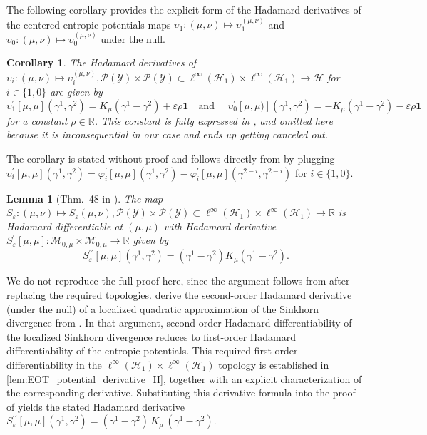\documentclass{article}
\theoremstyle{plain}
\newtheorem{lemma}[theorem]{Lemma}
\newtheorem{corollary}[theorem]{Corollary}
\theoremstyle{definition}
\theoremstyle{remark}
\newcommand{\R}{\mathbb{R}}
\newcommand{\cH}{\mathcal{H}}
\newcommand{\cP}{\mathcal{P}}
\newcommand{\cM}{\mathcal{M}}
\newcommand{\cY}{\mathcal{Y}}
\newcommand{\1}{\mathbbm{1}}
\newcommand{\eps}{\varepsilon}
\theoremstyle{plain}
\theoremstyle{definition}
\newcommand{\tand}{\textrm{and }}
\begin{document}
     The following corollary provides the explicit form of the Hadamard derivatives of the centered entropic potentials maps $\upsilon_1: (\mu, \nu) \mapsto \upsilon_1^{(\mu, \nu)}$ and $\upsilon_0: (\mu, \nu) \mapsto \upsilon_0^{(\mu, \nu)}$ under the null. 
    \begin{corollary}\label{cor:upsilon_hadamard_diff}
        The Hadamard derivatives of $\upsilon_i : (\mu, \nu) \mapsto \upsilon_i^{(\mu, \nu)}, \cP(\cY) \times \cP(\cY) \subset \ell^\infty(\cH_1) \times \ell^\infty(\cH_1) \to \cH$ for $i \in \{1,0\}$ are given by
         \[
        \upsilon_1^\prime [\mu, \mu](\gamma^1, \gamma^2) = K_\mu(\gamma^1 - \gamma^2) + \eps \rho \mathbf{1} \quad \tand \quad \upsilon_0^\prime[\mu, \mu)](\gamma^1, \gamma^2) = - K_\mu(\gamma^1 - \gamma^2) - \eps \rho \mathbf{1}
        \]
        for a constant $\rho\in \R$. This constant is fully expressed in \citet[Thm.~40]{kokot2025coreset}, and omitted here because it is inconsequential in our case and ends up getting canceled out.
    \end{corollary}
    The corollary is stated without proof and follows directly from \citet[Cor.~43]{kokot2025coreset} by plugging $\upsilon_i^\prime[\mu, \mu](\gamma^1, \gamma^2) = \varphi_i^\prime[\mu, \mu](\gamma^1, \gamma^2) - \varphi_i^\prime[\mu, \mu](\gamma^{2-i}, \gamma^{2-i})$ for $i \in \{1,0\}$.
    

\begin{lemma}[Thm.~48 in \citealp{kokot2025coreset}]\label{lem:sinkhorn_second_order_Hadamard_diff}
    The map $S_\eps : (\mu, \nu) \mapsto S_\eps(\mu, \nu), \cP(\cY) \times \cP(\cY) \subset \ell^\infty(\cH_1) \times \ell^\infty(\cH_1) \to \R$ is Hadamard differentiable at $(\mu, \mu)$ with Hadamard derivative $S_\eps^\prime[\mu, \mu]: \cM_{0, \mu} \times \cM_{0, \mu} \to \R$ given by
    \[
    S_\eps^{\prime\prime}[\mu, \mu](\gamma^1, \gamma^2) = (\gamma^1 - \gamma^2) K_\mu (\gamma^1 - \gamma^2).
    \]
\end{lemma}
We do not reproduce the full proof here, since the argument follows from \citet[Thm.~48]{kokot2025coreset} after replacing the required topologies. \citet[Thm.~48]{kokot2025coreset} derive the second-order Hadamard derivative (under the null) of a localized quadratic approximation of the Sinkhorn divergence from \citet[Lem.~45]{kokot2025coreset}. In that argument, second-order Hadamard differentiability of the localized Sinkhorn divergence reduces to first-order Hadamard differentiability of the entropic potentials. This required first-order differentiability in the $\ell^\infty(\cH_1) \times \ell^\infty(\cH_1)$ topology is established in \cref{lem:EOT_potential_derivative_H}, together with an explicit characterization of the corresponding derivative. Substituting this derivative formula into the proof of \citet[Thm.~48]{kokot2025coreset} yields the stated Hadamard derivative $S_\eps^{\prime\prime}[\mu,\mu](\gamma^1,\gamma^2)
=
(\gamma^1-\gamma^2)\,K_\mu\,(\gamma^1-\gamma^2)$.
\end{document}
